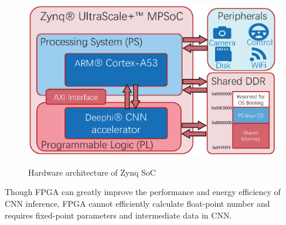 \begin{figure}[thb]  
    \centering  
    {\includegraphics[width=0.95\linewidth]{fig/plps.eps}\label{fig:plps}} 
    \caption{Hardware architecture of Zynq SoC}
\end{figure}

Though FPGA can greatly improve the performance and energy efficiency of CNN inference, FPGA cannot efficiently calculate float-point number and requires fixed-point parameters and intermediate data in CNN.